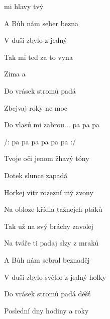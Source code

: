 

\zs
{} mi  hlavy tvý 

A Bůh nám seber bezna

V duši zbylo  z jedný 

Tak mi teď za to vyna

Zima a  

Do vrásek stromů padá 

Zbejvaj roky  ne moc 

\ks
\zr

Do vlasů mi zabrou... pa pa pa 

/: pa pa pa  pa pa pa  :/
\kr

\zs
Tvoje oči jenom žhavý tóny

Dotek slunce zapadá

Horkej vítr rozezní mý zvony

\ks
\zr \kr

\zs
Na obloze křídla tažnejch ptáků

Tak už na svý bráchy zavolej

Na tváře ti padaj slzy z mraků

A Bůh nám sebral beznaděj

V duši zbylo světlo z jedný holky

Do vrásek stromů padá déšť

Poslední dny hodiny a roky

\ks

\zr
\kr

\kp






